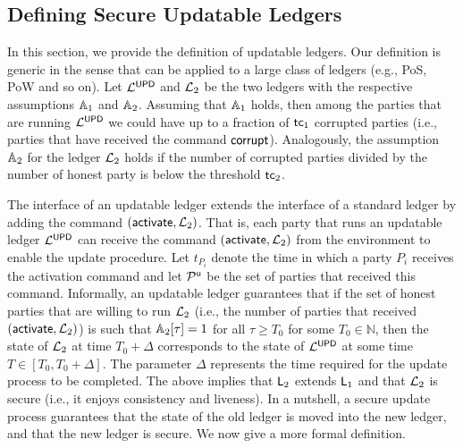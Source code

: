 
\subsection{Defining Secure Updatable Ledgers}
In this section, we provide the definition of updatable ledgers. Our definition is generic in the sense that can be applied to a large class of ledgers (e.g., PoS, PoW and so on).
Let $\mathcal{L}^\mathsf{UPD}$ and $\mathcal{L}_2$ be the two ledgers with the respective assumptions $\mathbb{A}_1$ and 
$\mathbb{A}_2$. 
Assuming that $\mathbb{A}_1$ holds, then among the parties that are running $\mathcal{L}^\mathsf{UPD}$ we could have up to a fraction of $\mathsf{tc}_1$ corrupted parties (i.e., parties that have received the command $\mathsf{corrupt}$).
Analogously, the assumption $\mathbb{A}_2$ for the ledger $\mathcal{L}_2$ holds if the number of corrupted parties
divided by the number of honest party is below the threshold $\mathsf{tc}_2$.

The interface of an updatable ledger extends the interface of a standard ledger by adding the command 
$(\mathsf{activate}, \mathcal{L}_2)$. 
That is, each party that runs an updatable ledger $\mathcal{L}^\mathsf{UPD}$ can receive the command $(\mathsf{activate}, \mathcal{L}_2)$
from the environment to enable the update procedure.
 Let $t_{P_i}$ denote the time in which
a party $P_i$ receives the activation command and let $\mathcal{P}^\mathsf{u}$ be the set of parties that received this command.
Informally, an updatable ledger guarantees that if the set of honest parties that are willing to run $\mathcal{L}_2$ (i.e., the number of parties that received $(\mathsf{activate},\mathcal{L}_2)$)
is such that $\mathbb{A}_2[\tau]=1$ for all $\tau\geq T_0$ for some $T_0\in\mathbb{N}$, then
the state of $\mathcal{L}_2$ at time $T_0+\Delta$ corresponds to the state of $\mathcal{L}^\mathsf{UPD}$ at some time $T\in [T_0,T_0+\Delta]$.
The parameter $\Delta$ represents the time required for the update process to be completed.
The above implies that $\mathsf{L}_2$  extends $\mathsf{L}_1$ and that $\mathcal{L}_2$ is secure (i.e., it enjoys consistency and liveness).
In a nutshell, a secure update process guarantees that the state of the old ledger is moved into the new ledger, and that the new ledger is secure.
We now give a more formal definition.


